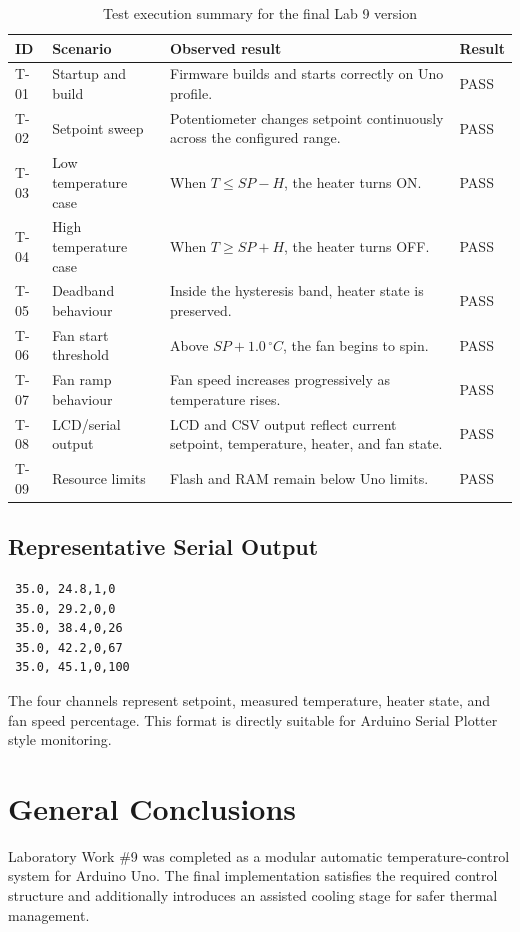 \documentclass[12pt]{article}
\begin{document}
\begin{table}[H]
\centering
\small
\begin{tabular}{p{0.8cm} p{3.2cm} p{6.0cm} p{1.3cm}}
\toprule
\textbf{ID} & \textbf{Scenario} & \textbf{Observed result} & \textbf{Result} \\
\midrule
T-01 & Startup and build & Firmware builds and starts correctly on Uno profile. & PASS \\
T-02 & Setpoint sweep & Potentiometer changes setpoint continuously across the configured range. & PASS \\
T-03 & Low temperature case & When \(T \le SP-H\), the heater turns ON. & PASS \\
T-04 & High temperature case & When \(T \ge SP+H\), the heater turns OFF. & PASS \\
T-05 & Deadband behaviour & Inside the hysteresis band, heater state is preserved. & PASS \\
T-06 & Fan start threshold & Above \(SP+1.0\,^{\circ}C\), the fan begins to spin. & PASS \\
T-07 & Fan ramp behaviour & Fan speed increases progressively as temperature rises. & PASS \\
T-08 & LCD/serial output & LCD and CSV output reflect current setpoint, temperature, heater, and fan state. & PASS \\
T-09 & Resource limits & Flash and RAM remain below Uno limits. & PASS \\
\bottomrule
\end{tabular}
\caption{Test execution summary for the final Lab 9 version}
\label{tab:testresults}
\end{table}

\subsection{Representative Serial Output}

\begin{verbatim}
 35.0, 24.8,1,0
 35.0, 29.2,0,0
 35.0, 38.4,0,26
 35.0, 42.2,0,67
 35.0, 45.1,0,100
\end{verbatim}

\hspace{0.8cm} The four channels represent setpoint, measured temperature, heater state, and fan speed percentage. This format is directly suitable for Arduino Serial Plotter style monitoring.

\section*{General Conclusions}
\hspace{0.8cm} Laboratory Work \#9 was completed as a modular automatic temperature-control system for Arduino Uno. The final implementation satisfies the required control structure and additionally introduces an assisted cooling stage for safer thermal management.
\end{document}
